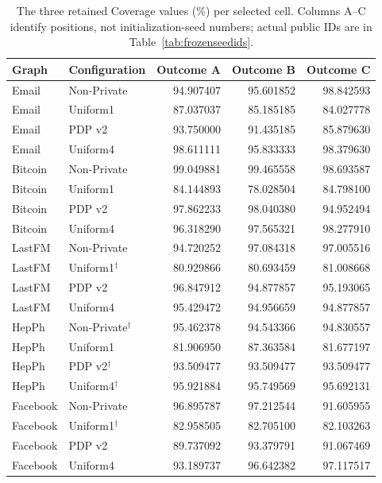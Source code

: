 \begin{table}[htbp]
\centering\small
\caption{The three retained Coverage values (\%) per selected cell. Columns A--C identify positions, not initialization-seed numbers; actual public IDs are in Table~\ref{tab:frozenseedids}.}\label{tab:frozenseeds}
\begin{tabular}{llrrr}
\toprule
Graph & Configuration & Outcome A & Outcome B & Outcome C\\ \midrule
Email & Non-Private & 94.907407 & 95.601852 & 98.842593 \\
Email & Uniform1 & 87.037037 & 85.185185 & 84.027778 \\
Email & PDP v2 & 93.750000 & 91.435185 & 85.879630 \\
Email & Uniform4 & 98.611111 & 95.833333 & 98.379630 \\
Bitcoin & Non-Private & 99.049881 & 99.465558 & 98.693587 \\
Bitcoin & Uniform1 & 84.144893 & 78.028504 & 84.798100 \\
Bitcoin & PDP v2 & 97.862233 & 98.040380 & 94.952494 \\
Bitcoin & Uniform4 & 96.318290 & 97.565321 & 98.277910 \\
LastFM & Non-Private & 94.720252 & 97.084318 & 97.005516 \\
LastFM & Uniform1$^{\dagger}$ & 80.929866 & 80.693459 & 81.008668 \\
LastFM & PDP v2 & 96.847912 & 94.877857 & 95.193065 \\
LastFM & Uniform4 & 95.429472 & 94.956659 & 94.877857 \\
HepPh & Non-Private$^{\dagger}$ & 95.462378 & 94.543366 & 94.830557 \\
HepPh & Uniform1 & 81.906950 & 87.363584 & 81.677197 \\
HepPh & PDP v2$^{\dagger}$ & 93.509477 & 93.509477 & 93.509477 \\
HepPh & Uniform4$^{\dagger}$ & 95.921884 & 95.749569 & 95.692131 \\
Facebook & Non-Private & 96.895787 & 97.212544 & 91.605955 \\
Facebook & Uniform1$^{\dagger}$ & 82.958505 & 82.705100 & 82.103263 \\
Facebook & PDP v2 & 89.737092 & 93.379791 & 91.067469 \\
Facebook & Uniform4 & 93.189737 & 96.642382 & 97.117517 \\
\bottomrule\end{tabular}
\end{table}
